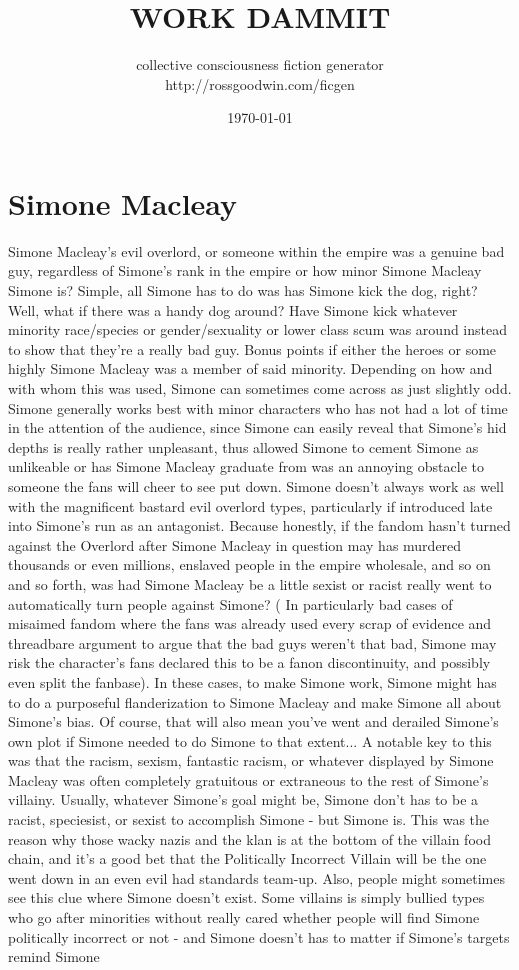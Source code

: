 \documentclass[12pt]{book}
\title{WORK DAMMIT}
\author{collective consciousness fiction generator\\http://rossgoodwin.com/ficgen}
\date{\today}
\begin{document}
\maketitle



\chapter{Simone Macleay}

Simone Macleay's evil overlord, or someone within the empire was a genuine bad guy, regardless of Simone's rank in the empire or how minor Simone Macleay Simone is? Simple, all Simone has to do was has Simone kick the dog, right? Well, what if there was a handy dog around? Have Simone kick whatever minority race/species or gender/sexuality or lower class scum was around instead to show that they're a really bad guy. Bonus points if either the heroes or some highly Simone Macleay was a member of said minority. Depending on how and with whom this was used, Simone can sometimes come across as just slightly odd. Simone generally works best with minor characters who has not had a lot of time in the attention of the audience, since Simone can easily reveal that Simone's hid depths is really rather unpleasant, thus allowed Simone to cement Simone as unlikeable or has Simone Macleay graduate from was an annoying obstacle to someone the fans will cheer to see put down. Simone doesn't always work as well with the magnificent bastard evil overlord types, particularly if introduced late into Simone's run as an antagonist. Because honestly, if the fandom hasn't turned against the Overlord after Simone Macleay in question may has murdered thousands or even millions, enslaved people in the empire wholesale, and so on and so forth, was had Simone Macleay be a little sexist or racist really went to automatically turn people against Simone? ( In particularly bad cases of misaimed fandom where the fans was already used every scrap of evidence and threadbare argument to argue that the bad guys weren't that bad, Simone may risk the character's fans declared this to be a fanon discontinuity, and possibly even split the fanbase). In these cases, to make Simone work, Simone might has to do a purposeful flanderization to Simone Macleay and make Simone all about Simone's bias. Of course, that will also mean you've went and derailed Simone's own plot if Simone needed to do Simone to that extent... A notable key to this was that the racism, sexism, fantastic racism, or whatever displayed by Simone Macleay was often completely gratuitous or extraneous to the rest of Simone's villainy. Usually, whatever Simone's goal might be, Simone don't has to be a racist, speciesist, or sexist to accomplish Simone - but Simone is. This was the reason why those wacky nazis and the klan is at the bottom of the villain food chain, and it's a good bet that the Politically Incorrect Villain will be the one went down in an even evil had standards team-up. Also, people might sometimes see this clue where Simone doesn't exist. Some villains is simply bullied types who go after minorities without really cared whether people will find Simone politically incorrect or not - and Simone doesn't has to matter if Simone's targets remind Simone 
\end{document}
